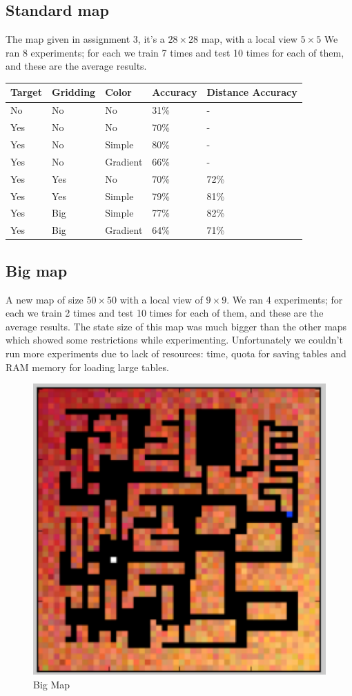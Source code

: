 \documentclass[a4paper]{article}
\begin{document}
\subsection{Standard map}
The map given in assignment 3, it's a $28 \times 28$ map, with a local view $5 \times 5$
We ran 8 experiments; for each we train 7 times and test 10 times for each of them, and these are the average results.
\begin{center}
    \begin{tabular}{| l | l | l | l | l |}
    \hline
    Target & Gridding & Color & Accuracy & Distance Accuracy \\ \hline
    No & No & No & 31\% & - \\ \hline
    Yes & No & No & 70\% & - \\ \hline
    Yes & No & Simple & 80\% & - \\ \hline
    Yes & No & Gradient & 66\% & - \\ \hline
    Yes & Yes & No & 70\% & 72\% \\ \hline
    Yes & Yes & Simple & 79\% & 81\% \\ \hline
    Yes & Big & Simple & 77\% & 82\% \\ \hline
    Yes & Big & Gradient & 64\% & 71\% \\ \hline
    \end{tabular}
\end{center}

\subsection{Big map}
A new map of size $50 \times 50$ with a local view of $9 \times 9$.
We ran 4 experiments; for each we train 2 times and test 10 times for each of them, and these are the average results.
The state size of this map was much bigger than the other maps which showed some restrictions while experimenting.
Unfortunately we couldn't run more experiments due to lack of resources: time, quota for saving tables and RAM memory for loading large tables.

\begin{figure}
    \centerline{\includegraphics[width=0.45\linewidth]{bigmap.png}}
    \caption{Big Map}\label{fig4}
\end{figure}
\end{document}
